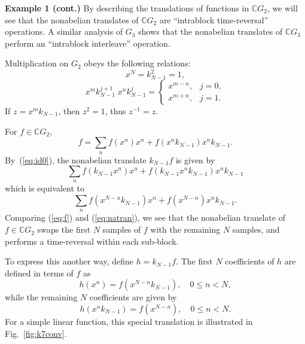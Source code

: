 \documentclass[reqno,onecolumn,oneside]{paper}
\newcommand{\<}{\ensuremath{\langle}}
\renewcommand{\>}{\ensuremath{\rangle}}
\newcommand{\inverse}[1]{\ensuremath{#1^{-1}}}
\newcommand{\field}[1]{\ensuremath{\mathbb{#1}}}
\newcommand{\C}{\field{C}}                   %
\newcommand{\ga}[1]{\ensuremath{\C #1}} %
\newcommand{\CG}{\ga{G}}                %
\begin{document}
\begin{example}
{\bf Example 1 (cont.)}  
By describing the translations of functions in $\CG_2$,  
we will see that the nonabelian translates of
$\CG_2$ are ``intrablock time-reversal'' operations.
A similar analysis of $G_3$ shows that the nonabelian 
translates of $\CG_3$ perform an ``intrablock interleave''
operation. 

Multiplication on $G_2$ obeys the following relations:
\begin{equation}\label{eq:id0}
  x^N = k_{N-1}^2 = 1,
\end{equation}
\begin{equation}
  x^mk_{N-1}^{j+1} \; x^nk_{N-1}^j = 
  \begin{cases} 
    x^{m-n}, & j=0,\\
    x^{m+n}, & j=1.
  \end{cases}
\end{equation}
If $z=x^mk_{N-1}$, then $z^2=1$, thus $\inverse{z}=z$.

For $f\in \CG_2$, 
\begin{equation}\label{eq:f}
  f = \sum_n f(x^n)x^n + f(x^n k_{N-1})x^n k_{N-1}.
\end{equation}
By~(\ref{eq:id0}), the nonabelian translate $k_{N-1}f$
is given by
\[
\sum_n f(k_{N-1}x^n)x^n + f(k_{N-1}x^n k_{N-1})x^n k_{N-1}
\]
which is equivalent to 
\begin{equation}\label{eq:natran}
\sum_n f(x^{N-n} k_{N-1})x^n + f(x^{N-n}) x^n k_{N-1}.
\end{equation}
Comparing (\ref{eq:f}) and (\ref{eq:natran}), we see that
the nonabelian translate of $f\in \CG_2$ swaps the first $N$
samples of $f$ with the remaining $N$ samples, and performs
a time-reversal within each sub-block.


%
%

To express this another way, define $h=k_{N-1}f$. 
The first $N$ coefficients of $h$ are defined in terms of $f$ as
\[
h(x^n)= f(x^{N-n} k_{N-1}), \quad 0\leq n < N,
\]
while the remaining $N$ coefficients are given by
\[
h(x^n k_{N-1}) = f(x^{N-n}), \quad 0\leq n < N.
\]
For a simple linear function, this special translation is
illustrated in Fig.~\ref{fig:k7conv}.



\end{example}
\end{document}

